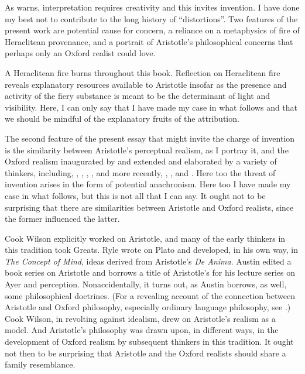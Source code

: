 As \citet[225]{Sorabji:2003fk} warns, interpretation requires creativity and this invites invention. I have done my best not to contribute to the long history of ``distortions''. Two features of the present work are potential cause for concern, a reliance on a metaphysics of fire of Heraclitean provenance, and a portrait of Aristotle's philosophical concerns that perhaps only an Oxford realist could love. 

A Heraclitean fire burns throughout this book. Reflection on Heraclitean fire reveals explanatory resources available to Aristotle insofar as the presence and activity of the fiery substance is meant to be the determinant of light and visibility. Here, I can only say that I have made my case in what follows and that we should be mindful of the explanatory fruits of the attribution. 

The second feature of the present essay that might invite the charge of invention is the similarity between Aristotle's perceptual realism, as I portray it, and the Oxford realism inaugurated by \citet{Cook-Wilson:1926sf} and extended and elaborated by a variety of thinkers, including, \citet{Prichard:1909yg,Prichard:1950kx}, \citet{Ryle:1949qr}, \citet{Austin:1961bs,Austin:1962lr}, \citet{Hinton:1973js}, and more recently, \citet{McDowell:1994am}, \citet{Travis:2008la}, and \citet{Williamson:2000lr}. Here too the threat of invention arises in the form of potential anachronism. Here too I have made my case in what follows, but this is not all that I can say. It ought not to be surprising that there are similarities between Aristotle and Oxford realists, since the former influenced the latter. 

Cook Wilson explicitly worked on Aristotle, and many of the early thinkers in this tradition took Greats. Ryle wrote on Plato and developed, in his own way, in \emph{The Concept of Mind}, ideas derived from Aristotle's \emph{De Anima}. Austin edited a book series on Aristotle and borrows a title of Aristotle's for his lecture series on Ayer and perception. Nonaccidentally, it turns out, as Austin borrows, as well, some philosophical doctrines. (For a revealing account of the connection between Aristotle and Oxford philosophy, especially ordinary language philosophy, see \citealt[Introduction]{Ackrill:1997tg}.) Cook Wilson, in revolting against idealism, drew on Aristotle's realism as a model. And Aristotle's philosophy was drawn upon, in different ways, in the development of Oxford realism by subsequent thinkers in this tradition. It ought not then to be surprising that Aristotle and the Oxford realists should share a family resemblance.

